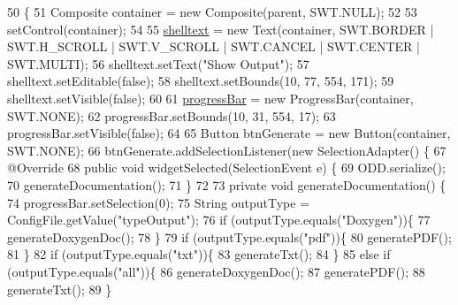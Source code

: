 \begin{DoxyCode}
50                                                 \{
51         Composite container = \textcolor{keyword}{new} Composite(parent, SWT.NULL);
52 
53         setControl(container);
54         
55         \hyperlink{classit_1_1isislab_1_1masonassisteddocumentation_1_1mason_1_1wizards_1_1_q___end_wizard_ac5e6042df131960cc6061862b2a7b8ce}{shelltext} = \textcolor{keyword}{new} Text(container, SWT.BORDER | SWT.H\_SCROLL | SWT.V\_SCROLL | SWT.CANCEL | 
      SWT.CENTER | SWT.MULTI);
56         shelltext.setText(\textcolor{stringliteral}{"Show Output"});
57         shelltext.setEditable(\textcolor{keyword}{false});
58         shelltext.setBounds(10, 77, 554, 171);
59         shelltext.setVisible(\textcolor{keyword}{false});
60         
61         \hyperlink{classit_1_1isislab_1_1masonassisteddocumentation_1_1mason_1_1wizards_1_1_q___end_wizard_afe3af585753c6f0c523146360faa433c}{progressBar} = \textcolor{keyword}{new} ProgressBar(container, SWT.NONE);
62         progressBar.setBounds(10, 31, 554, 17);
63         progressBar.setVisible(\textcolor{keyword}{false});
64         
65         Button btnGenerate = \textcolor{keyword}{new} Button(container, SWT.NONE);
66         btnGenerate.addSelectionListener(\textcolor{keyword}{new} SelectionAdapter() \{
67             @Override
68             \textcolor{keyword}{public} \textcolor{keywordtype}{void} widgetSelected(SelectionEvent e) \{
69                 ODD.serialize();
70                 generateDocumentation();
71             \}
72 
73             \textcolor{keyword}{private} \textcolor{keywordtype}{void} generateDocumentation() \{
74                 progressBar.setSelection(0);
75                 String outputType = ConfigFile.getValue(\textcolor{stringliteral}{"typeOutput"});
76                 \textcolor{keywordflow}{if} (outputType.equals(\textcolor{stringliteral}{"Doxygen"}))\{
77                     generateDoxygenDoc();   
78                 \}
79                 \textcolor{keywordflow}{if} (outputType.equals(\textcolor{stringliteral}{"pdf"}))\{
80                     generatePDF();
81                 \}
82                 \textcolor{keywordflow}{if} (outputType.equals(\textcolor{stringliteral}{"txt"}))\{
83                     generateTxt();                  
84                 \}   
85                 \textcolor{keywordflow}{else} \textcolor{keywordflow}{if} (outputType.equals(\textcolor{stringliteral}{"all"}))\{
86                     generateDoxygenDoc();
87                     generatePDF();
88                     generateTxt();  
89                 \}

\end{DoxyCode}
